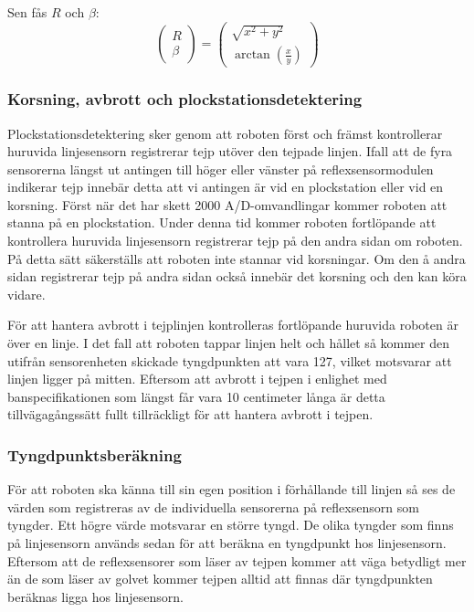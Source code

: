 Sen fås $R$ och $\beta$:
$$\begin{pmatrix}
R \\ \beta
\end{pmatrix}
 = 
\begin{pmatrix}
\sqrt{x^2 + y^2} \\ 
\arctan(\frac{x}{y})
\end{pmatrix}$$

\subsubsection{Korsning, avbrott och plockstationsdetektering}

Plockstationsdetektering sker genom att roboten först och främst kontrollerar huruvida linjesensorn registrerar tejp utöver den tejpade linjen. Ifall att de fyra sensorerna längst ut antingen till höger eller vänster på reflexsensormodulen indikerar tejp innebär detta att vi antingen är vid en plockstation eller vid en korsning. Först när det har skett 2000 A/D-omvandlingar kommer roboten att stanna på en plockstation. Under denna tid kommer roboten fortlöpande att kontrollera huruvida linjesensorn registrerar tejp på den andra sidan om roboten. På detta sätt säkerställs att roboten inte stannar vid korsningar. Om den å andra sidan registrerar tejp på andra sidan också innebär det korsning och den kan köra vidare. 

För att hantera avbrott i tejplinjen kontrolleras fortlöpande huruvida roboten är över en linje. I det fall att roboten tappar linjen helt och hållet så kommer den utifrån sensorenheten skickade tyngdpunkten att vara 127, vilket motsvarar att linjen ligger på mitten. Eftersom att avbrott i tejpen i enlighet med banspecifikationen som längst får vara 10 centimeter långa är detta tillvägagångssätt fullt tillräckligt för att hantera avbrott i tejpen.
 


\subsubsection{Tyngdpunktsberäkning}
För att roboten ska känna till sin egen position i förhållande till linjen så ses de värden som registreras av de individuella sensorerna på reflexsensorn som tyngder. Ett högre värde motsvarar en större tyngd. De olika tyngder som finns på linjesensorn används sedan för att beräkna en tyngdpunkt hos linjesensorn. Eftersom att de reflexsensorer som läser av tejpen kommer att väga betydligt mer än de som läser av golvet kommer tejpen alltid att finnas där tyngdpunkten beräknas ligga hos linjesensorn.


